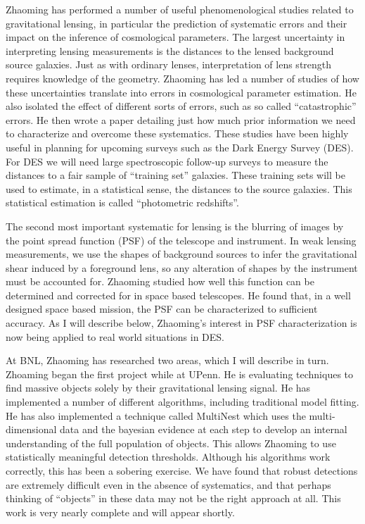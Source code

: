 \documentclass[12pt]{letter}
\begin{document}
\begin{letter}{}
Zhaoming has performed a number of useful phenomenological studies related to
gravitational lensing, in particular the prediction of systematic errors and
their impact on the inference of cosmological parameters.  The largest
uncertainty in interpreting lensing measurements is the distances to the lensed
background source galaxies. Just as with ordinary lenses, interpretation of
lens strength requires knowledge of the geometry.  Zhaoming has led a number of
studies of how these uncertainties translate into errors in cosmological
parameter estimation. He also isolated the effect of different sorts of errors,
such as so called ``catastrophic'' errors.  He then wrote a paper detailing
just how much prior information we need to characterize and overcome these
systematics.  These studies have been highly useful in planning for upcoming
surveys such as the Dark Energy Survey (DES). For DES we will need large
spectroscopic follow-up surveys to measure the distances to a fair sample of
``training set'' galaxies.  These training sets will be used to estimate, in a
statistical sense, the distances to the source galaxies. This statistical
estimation is called ``photometric redshifts''.

The second most important systematic for lensing is the blurring of images by
the point spread function (PSF) of the telescope and instrument.  In weak
lensing measurements, we use the shapes of background sources to infer the
gravitational shear induced by a foreground lens, so any alteration of shapes
by the instrument must be accounted for.  Zhaoming studied how well this
function can be determined and corrected for in space based telescopes.  He
found that, in a well designed space based mission, the PSF can be
characterized to sufficient accuracy.  As I will describe below, Zhaoming's
interest in PSF characterization is now being applied to real world situations
in DES.


At BNL, Zhaoming has researched two areas, which I will describe in turn.
Zhoaming began the first project while at UPenn. He is evaluating techniques to
find massive objects solely by their gravitational lensing signal.  He has
implemented a number of different algorithms, including traditional model
fitting. He has also implemented a technique called MultiNest which uses the
multi-dimensional data and the bayesian evidence at each step to develop an
internal understanding of the full population of objects. This allows Zhaoming
to use statistically meaningful detection thresholds.  Although his algorithms
work correctly, this has been a sobering exercise. We have found that robust
detections are extremely difficult even in the absence of systematics, and that
perhaps thinking of ``objects'' in these data may not be the right approach at
all.  This work is very nearly complete and will appear shortly.


\end{letter}
\end{document}
